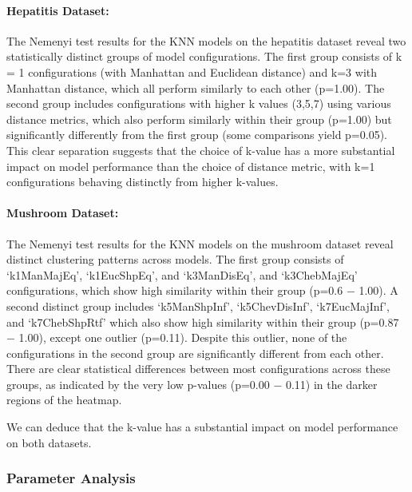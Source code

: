 \paragraph{Hepatitis Dataset:} The Nemenyi test results for the KNN models on the hepatitis dataset reveal two statistically distinct
groups of model configurations. The first group consists of k = 1 configurations
(with Manhattan and Euclidean distance) and k=3 with Manhattan distance, which all perform similarly to each other (p=1.00).
The second group includes configurations with higher k values (3,5,7) using various distance metrics,
which also perform similarly within their group (p=1.00) but significantly differently from the first
group (some comparisons yield p=0.05). This clear separation suggests that the choice of k-value
has a more substantial impact on model performance than the choice of distance metric, with k=1 configurations behaving distinctly from higher k-values.

\paragraph{Mushroom Dataset:} The Nemenyi test results for the KNN models on the mushroom dataset reveal distinct clustering patterns across models.
The first group consists of `k1ManMajEq', `k1EucShpEq', and `k3ManDisEq', and `k3ChebMajEq' configurations, which show
high similarity within their group (p=0.6 $-$ 1.00). A second distinct group includes `k5ManShpInf', `k5ChevDisInf',
`k7EucMajInf', and `k7ChebShpRtf' which also show high similarity within their group (p=0.87 $-$ 1.00), except 
one outlier (p=0.11). Despite this outlier, none of the configurations in the second group are significantly different from each other.
There are clear statistical differences between most configurations across these groups,
as indicated by the very low p-values (p=0.00 $-$ 0.11) in the darker regions of the heatmap.

We can deduce that the k-value has a substantial impact on model performance on both datasets. 

\subsubsection*{Parameter Analysis}

